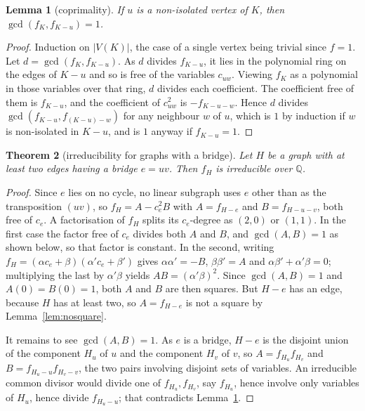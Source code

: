 \documentclass[11pt]{article}
\newtheorem{theorem}{Theorem}[section]
\newtheorem{lemma}[theorem]{Lemma}
\theoremstyle{definition}
\theoremstyle{remark}
\theoremstyle{definition}
\begin{document}
\begin{lemma}[coprimality]\label{lem:coprime}
If $u$ is a non-isolated vertex of $K$, then $\gcd(f_K,f_{K-u})=1$.
\end{lemma}

\begin{proof}
Induction on $|V(K)|$, the case of a single vertex being trivial since $f=1$. Let
$d=\gcd(f_K,f_{K-u})$. As $d$ divides $f_{K-u}$, it lies in the polynomial ring on the edges of
$K-u$ and so is free of the variables $c_{uw}$. Viewing $f_K$ as a polynomial in those variables
over that ring, $d$ divides each coefficient. The coefficient free of them is $f_{K-u}$, and the
coefficient of $c_{uw}^2$ is $-f_{K-u-w}$. Hence $d$ divides $\gcd(f_{K-u},f_{(K-u)-w})$ for any
neighbour $w$ of $u$, which is $1$ by induction if $w$ is non-isolated in $K-u$, and is $1$ anyway
if $f_{K-u}=1$.
\end{proof}

\begin{theorem}[irreducibility for graphs with a bridge]\label{thm:irredbridge}
Let $H$ be a graph with at least two edges having a bridge $e=uv$. Then $f_H$ is irreducible
over $\mathbb{Q}$.
\end{theorem}

\begin{proof}
Since $e$ lies on no cycle, no linear subgraph uses $e$ other than as the transposition $(uv)$, so
$f_H=A-c_e^2B$ with $A=f_{H-e}$ and $B=f_{H-u-v}$, both free of $c_e$. A factorisation of $f_H$
splits its $c_e$-degree as $(2,0)$ or $(1,1)$. In the first case the factor free of $c_e$ divides
both $A$ and $B$, and $\gcd(A,B)=1$ as shown below, so that factor is constant. In the second,
writing $f_H=(\alpha c_e+\beta)(\alpha'c_e+\beta')$ gives $\alpha\alpha'=-B$, $\beta\beta'=A$ and
$\alpha\beta'+\alpha'\beta=0$; multiplying the last by $\alpha'\beta$ yields $AB=(\alpha'\beta)^2$.
Since $\gcd(A,B)=1$ and $A(0)=B(0)=1$, both $A$ and $B$ are then squares. But $H-e$ has an edge,
because $H$ has at least two, so $A=f_{H-e}$ is not a square by Lemma~\ref{lem:nosquare}.

It remains to see $\gcd(A,B)=1$. As $e$ is a bridge, $H-e$ is the disjoint union of the component
$H_u$ of $u$ and the component $H_v$ of $v$, so $A=f_{H_u}f_{H_v}$ and
$B=f_{H_u-u}f_{H_v-v}$, the two pairs involving disjoint sets of variables. An irreducible common
divisor would divide one of $f_{H_u},f_{H_v}$, say $f_{H_u}$, hence involve only variables of
$H_u$, hence divide $f_{H_u-u}$; that contradicts Lemma~\ref{lem:coprime}.
\end{proof}
\end{document}
